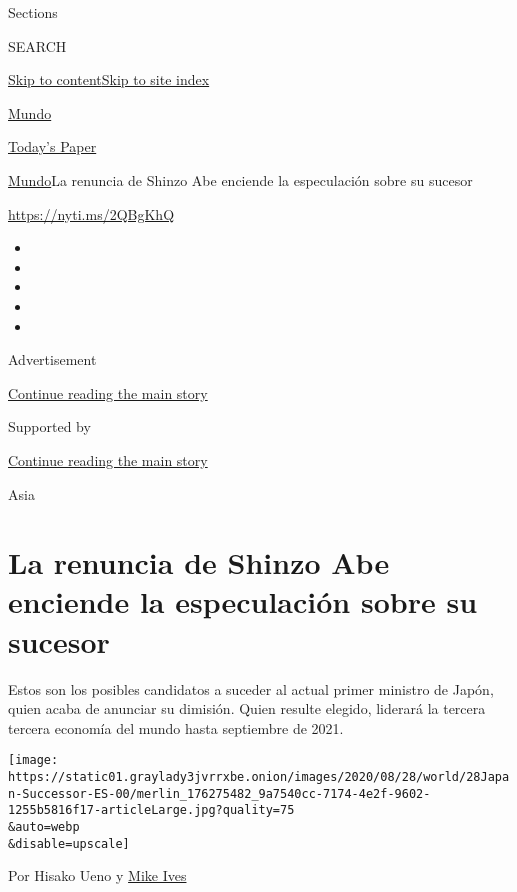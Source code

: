 Sections

SEARCH

\protect\hyperlink{site-content}{Skip to
content}\protect\hyperlink{site-index}{Skip to site index}

\href{https://www.nytimes3xbfgragh.onion/es/section/mundo}{Mundo}

\href{https://myaccount.nytimes3xbfgragh.onion/auth/login?response_type=cookie\&client_id=vi}{}

\href{https://www.nytimes3xbfgragh.onion/section/todayspaper}{Today's
Paper}

\href{/es/section/mundo}{Mundo}\textbar{}La renuncia de Shinzo Abe
enciende la especulación sobre su sucesor

\url{https://nyti.ms/2QBgKhQ}

\begin{itemize}
\item
\item
\item
\item
\item
\end{itemize}

Advertisement

\protect\hyperlink{after-top}{Continue reading the main story}

Supported by

\protect\hyperlink{after-sponsor}{Continue reading the main story}

Asia

\hypertarget{la-renuncia-de-shinzo-abe-enciende-la-especulaciuxf3n-sobre-su-sucesor}{%
\section{La renuncia de Shinzo Abe enciende la especulación sobre su
sucesor}\label{la-renuncia-de-shinzo-abe-enciende-la-especulaciuxf3n-sobre-su-sucesor}}

Estos son los posibles candidatos a suceder al actual primer ministro de
Japón, quien acaba de anunciar su dimisión. Quien resulte elegido,
liderará la tercera tercera economía del mundo hasta septiembre de 2021.

\texttt{[image: https://static01.graylady3jvrrxbe.onion/images/2020/08/28/world/28Japan-Successor-ES-00/merlin\_176275482\_9a7540cc-7174-4e2f-9602-1255b5816f17-articleLarge.jpg?quality=75\\\&auto=webp\\\&disable=upscale]}

Por Hisako Ueno y
\href{https://www.nytimes3xbfgragh.onion/by/mike-ives}{Mike Ives}

